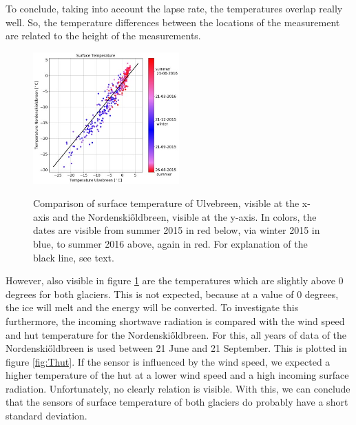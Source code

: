 \documentclass[11pt]{report}
\begin{document}
To conclude, taking into account the lapse rate, the temperatures overlap really well. So, the temperature differences between the locations of the measurement are related to the height of the measurements.


\begin{figure}[h]
\centering{}
    \includegraphics[scale=0.5, width=0.5\textwidth]{Tsurf.jpg}
    \label{fig:Tsurf}
    \caption{Comparison of surface temperature of Ulvebreen, visible at the x-axis and the Nordenski\H{o}ldbreen, visible at the y-axis. In colors, the dates are visible from summer 2015 in red below, via winter 2015 in blue, to summer 2016 above, again in red. For explanation of the black line, see text.}
\end{figure}

\newpage
However, also visible in figure \ref{fig:Tsurf} are the temperatures which are slightly above 0 degrees for both glaciers. This is not expected, because at a value of 0 degrees, the ice will melt and the energy will be converted. To investigate this furthermore, the incoming shortwave radiation is compared with the wind speed and hut temperature for the Nordenski\H{o}ldbreen. For this, all years of data of the Nordenski\H{o}ldbreen is used between 21 June and 21 September. This is plotted in figure \ref{fig:Thut}. If the sensor is influenced by the wind speed, we expected a higher temperature of the hut at a lower wind speed and a high incoming surface radiation. Unfortunately, no clearly relation is visible. With this, we can conclude that the sensors of surface temperature of both glaciers do probably have a short standard deviation. 
\end{document}
